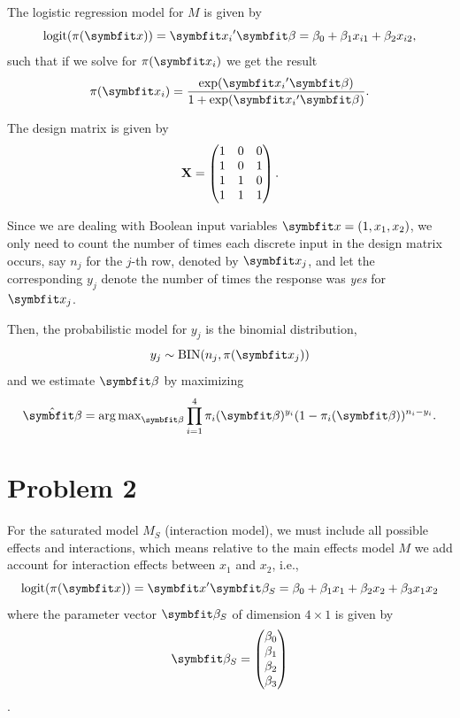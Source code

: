 \documentclass[
  11pt,
]{article}
\begin{document}
The logistic regression model for \(M\) is given by \[
  \operatorname{logit}(\pi(\v{x})) = \v{x_i}' \v{\beta} = \beta_0 + \beta_1 x_{i 1} + \beta_2 x_{i 2},
\] such that if we solve for \(\pi(\v{x_i})\) we get the result \[
  \pi(\v{x_i}) = \frac{\exp(\v{x_i}' \v{\beta})}{1+\exp(\v{x_i}' \v{\beta})}.
\]

The design matrix is given by \[
\mathbf{X}
=
\begin{pmatrix}
  1 & 0 & 0\\
  1 & 0 & 1\\
  1 & 1 & 0\\
  1 & 1 & 1
\end{pmatrix}.
\]

Since we are dealing with Boolean input variables
\(\v{x} = (1,x_1,x_2)\), we only need to count the number of times each
discrete input in the design matrix occurs, say \(n_j\) for the \(j\)-th
row, denoted by \(\v{x_j}\), and let the corresponding \(y_j\) denote
the number of times the response was \emph{yes} for \(\v{x_j}\).

Then, the probabilistic model for \(y_j\) is the binomial distribution,
\[
  y_j \sim \operatorname{BIN}(n_j, \pi(\v{x_j}))
\] and we estimate \(\v{\beta}\) by maximizing \[
  \hat{\v{\beta}} = \argmax_{\v{\beta}} \prod_{i=1}^4 \pi_i(\v{\beta})^{y_i}(1-\pi_i(\v{\beta}))^{n_i - y_i}.
\]

\hypertarget{problem-2}{%
\section{Problem 2}\label{problem-2}}


For the saturated model \(M_S\) (interaction model), we must include all
possible effects and interactions, which means relative to the main
effects model \(M\) we add account for interaction effects between
\(x_1\) and \(x_2\), i.e., \[
  \operatorname{logit}(\pi(\v{x})) = \v{x}' \v{\beta_S} = \beta_0 + \beta_1 x_1 + \beta_2 x_2 + \beta_3 x_1 x_2
\] where the parameter vector \(\v{\beta_S}\) of dimension
\(4 \times 1\) is given by \[
\v{\beta_S} =
\begin{pmatrix}
  \beta_0\\
  \beta_1\\
  \beta_2\\
  \beta_3
\end{pmatrix}
\].
\end{document}
